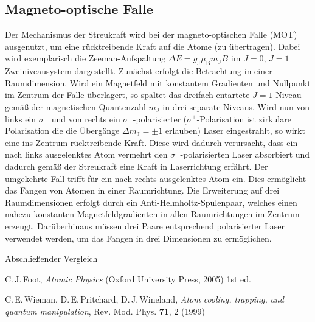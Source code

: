 \documentclass[twocolumn]{revtex4}
\begin{document}
\subsection{Magneto-optische Falle}
Der Mechanismus der Streukraft wird bei der magneto-optischen Falle (MOT)  ausgenutzt, um eine rücktreibende Kraft auf die Atome (zu übertragen).
Dabei wird exemplarisch die Zeeman-Aufspaltung $\Delta E = g_\mathrm{J} \mu_\mathrm{B} m_\mathrm{J} B$ im $J=0$, $J=1$ Zweiniveausystem dargestellt.
Zunächst erfolgt die Betrachtung in einer Raumdimension.
Wird ein Magnetfeld mit konstantem Gradienten und Nullpunkt im Zentrum der Falle überlagert, so spaltet das dreifach entartete $J=1$-Niveau gemäß der magnetischen Quantenzahl $m_\mathrm{J}$ in drei separate Niveaus.
Wird nun von links ein $\sigma^+$ und von rechts ein $\sigma^-$-polarisierter ($\sigma^\pm$-Polarisation ist zirkulare Polarisation die die Übergänge $\Delta m_\mathrm{J} = \pm 1$ erlauben) Laser eingestrahlt, so wirkt eine ins Zentrum rücktreibende Kraft.
Diese wird dadurch verursacht, dass ein nach links ausgelenktes Atom vermehrt den $\sigma^-$-polarisierten Laser absorbiert und dadurch gemäß der Streukraft eine Kraft in Laserrichtung erfährt.
Der umgekehrte Fall trifft für ein nach rechts ausgelenktes Atom ein.
Dies ermöglicht das Fangen von Atomen in einer Raumrichtung.
Die Erweiterung auf drei Raumdimensionen erfolgt durch ein Anti-Helmholtz-Spulenpaar, welches einen nahezu konstanten Magnetfeldgradienten in allen Raumrichtungen im Zentrum erzeugt.
Darüberhinaus müssen drei Paare  entsprechend polarisierter Laser verwendet werden, um das Fangen in drei Dimensionen zu ermöglichen.


Abschließender Vergleich


\begin{thebibliography}{}
C.\,J.\,Foot, {\it Atomic Physics} (Oxford University Press, 2005) 1st ed.

C.\,E.\,Wieman, D.\,E.\,Pritchard, D.\,J.\,Wineland, {\it Atom cooling, trapping, and quantum manipulation}, Rev. Mod. Phys. \textbf{71}, 2 (1999)

\end{thebibliography}
\end{document}
